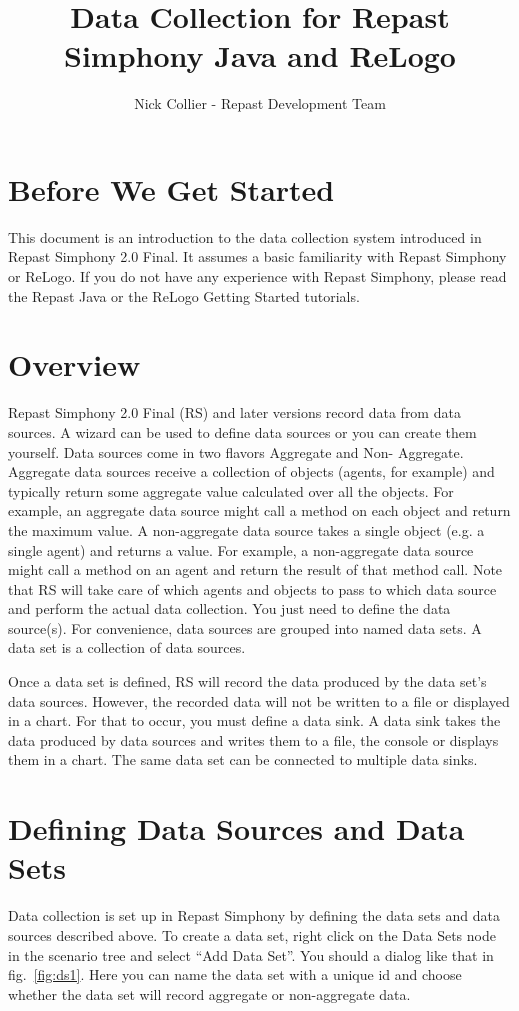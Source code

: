 \documentclass[11pt]{amsart}
\title{Data Collection for Repast Simphony Java and ReLogo}
\author{Nick Collier - Repast Development Team}
\begin{document}
 
\maketitle
\setcounter{section}{-1}

\section{Before We Get Started}
This document is an introduction to the data collection system introduced in Repast Simphony 2.0 Final. It assumes a basic familiarity with Repast Simphony or ReLogo. If you do not have any experience with Repast Simphony, please read the Repast Java or the ReLogo Getting Started tutorials.

\section{Overview}
Repast Simphony 2.0 Final (RS) and later versions record data from data sources. A wizard can be used to define data sources or you can create them yourself. Data sources come in two flavors Aggregate and Non- Aggregate. Aggregate data sources receive a collection of objects (agents, for example) and typically return some aggregate value calculated over all the objects. For example, an aggregate data source might call a method on each object and return the maximum value. A non-aggregate data source takes a single object (e.g. a single agent) and returns a value. For example, a non-aggregate data source might call a method on an agent and return the result of that method call. Note that RS will take care of which agents and objects to pass to which data source and perform the actual data collection. You just need to define the data source(s). For convenience, data sources are grouped into named data sets. A data set is a collection of data sources. 

Once a data set is defined, RS will record the data produced by the data set's data sources. However, the recorded data will not be written to a file or displayed in a chart. For that to occur, you must define a data sink. A data sink takes the data produced by data sources and writes them to a file, the console or displays them in a chart. The same data set can be connected to multiple data sinks. 

\section{Defining Data Sources and Data Sets}
Data collection is set up in Repast Simphony by defining the data sets and data sources described above. To create a data set, right click on the Data Sets node in the scenario tree and select ``Add Data Set''. You should a dialog like that in fig.~\ref{fig:ds1}. Here you can name the data set with a unique id and choose whether the data set will record aggregate or non-aggregate data. 
\end{document}
